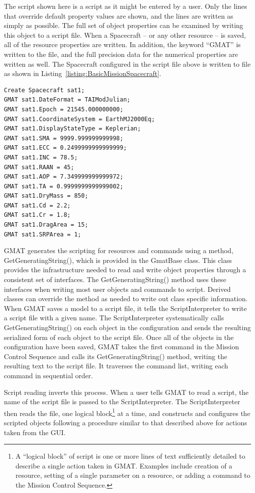 \noindent The script shown here is a script as it might be entered by a user.  Only the lines that
override default property values are shown, and the lines are written as simply as possible.  The
full set of object properties can be examined by writing this object to a script file.  When a
Spacecraft -- or any other resource -- is saved, all of the resource properties are written.  In
addition, the keyword ``GMAT'' is written to the file, and the full precision data for the numerical
properties are written as well.  The Spacecraft configured in the script file above is written to
file as shown in Listing~\ref{listing:BasicMissionSpacecraft}.

\lstset{numbers=left,firstnumber=1}
\begin{lstlisting}[caption={Script Listing for a Spacecraft},label={listing:BasicMissionSpacecraft}]
Create Spacecraft sat1;
GMAT sat1.DateFormat = TAIModJulian;
GMAT sat1.Epoch = 21545.000000000;
GMAT sat1.CoordinateSystem = EarthMJ2000Eq;
GMAT sat1.DisplayStateType = Keplerian;
GMAT sat1.SMA = 9999.999999999998;
GMAT sat1.ECC = 0.2499999999999999;
GMAT sat1.INC = 78.5;
GMAT sat1.RAAN = 45;
GMAT sat1.AOP = 7.349999999999972;
GMAT sat1.TA = 0.9999999999999002;
GMAT sat1.DryMass = 850;
GMAT sat1.Cd = 2.2;
GMAT sat1.Cr = 1.8;
GMAT sat1.DragArea = 15;
GMAT sat1.SRPArea = 1;
\end{lstlisting}
\lstset{numbers=none}

\noindent GMAT generates the scripting for resources and commands using a method,
GetGeneratingString(), which is provided in the GmatBase class.  This class provides the
infrastructure needed to read and write object properties through a consistent set of interfaces.
The GetGeneratingString() method uses these interfaces when writing most user objects and commands
to script.  Derived classes can override the method as needed to write out class specific
information.
When GMAT saves a model to a script file, it tells the ScriptInterpreter to write a script file with
a given name.  The ScriptInterpreter systematically calls GetGeneratingString() on each object in
the configuration and sends the resulting serialized form of each object to the script file.  Once
all of the objects in the configuration have been saved, GMAT takes the first command in the Mission
Control Sequence and calls its GetGeneratingString() method, writing the resulting text to the
script file.  It traverses the command list, writing each command in sequential order.

Script reading inverts this process.  When a user tells GMAT to read a script, the name of the
script file is passed to the ScriptInterpreter.  The ScriptInterpreter then reads the file, one
logical block\footnote{A ``logical block'' of script is one or more lines of text sufficiently
detailed to describe a single action taken in GMAT.  Examples include creation of a resource,
setting of a single parameter on a resource, or adding a command to the Mission Control Sequence.}
at a time, and constructs and configures the scripted objects following a procedure similar to that
described above for actions taken from the GUI.

